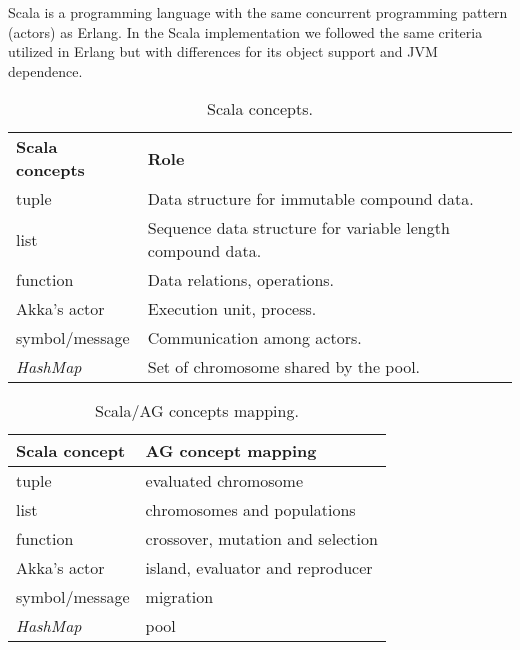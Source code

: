 
Scala is a programming language with the same concurrent programming pattern (actors) as Erlang. In the Scala implementation we followed the same criteria utilized in Erlang but with differences for its object support and JVM dependence.

\begin{table}[h!]
  \centering
   \caption{Scala concepts.}\label{sclConstructions}
\begin{tabular}{|>{\centering}p{2.6cm}|p{5cm}|}
  \hline
  \textbf{Scala concepts} & \textbf{Role} \tabularnewline
  tuple & Data structure for immutable compound data. \tabularnewline
    \hline
 list & Sequence data structure for variable length compound data.
 \tabularnewline
    \hline
 function & Data relations, operations. \tabularnewline
     \hline
    Akka's actor & Execution unit, process. \tabularnewline
     \hline
  symbol/message & Communication among actors. \tabularnewline
     \hline
  {\em HashMap} & Set of chromosome shared by the pool. \tabularnewline
     \hline
\end{tabular}

\end{table}

\begin{table}
  \centering
  \caption{Scala/AG concepts mapping.}\label{sclAGRelation}
\begin{tabular}{|>{\centering}p{2.6cm}|p{5cm}|}
  \hline
  \textbf{Scala concept} & \textbf{AG concept mapping} \tabularnewline
  \hline
   tuple & evaluated chromosome \tabularnewline
    \hline
 list & chromosomes and populations \tabularnewline
    \hline
 function & crossover, mutation and selection \tabularnewline
    \hline
  Akka's actor & island, evaluator and reproducer \tabularnewline
     \hline
  symbol/message & migration \tabularnewline
     \hline
  {\em HashMap} & pool \tabularnewline
     \hline
\end{tabular}

\end{table}






